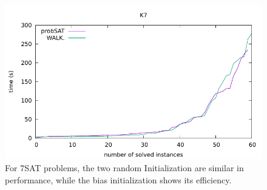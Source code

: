 \documentclass[12pt,a4paper,twoside]{scrartcl}
\numberwithin{equation}{section}
\begin{document}
  \begin{figure}[H]
\begin{center}
  \includegraphics[scale = 1]{DATA/K7/e4w.pdf}
  \end{center}
  \caption{For 7SAT problems, the two random Initialization are similar in performance, while the bias initialization shows its efficiency.}
  \label{Experiment 7 k7 cactus plot}
  \end{figure}
\end{document}
